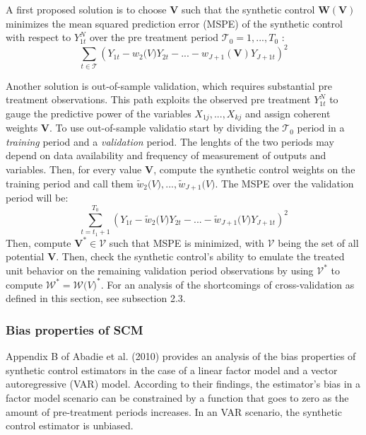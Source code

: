 \documentclass[12pt,a4paper,draft]{article}
\begin{document}
A first proposed solution is to choose $\mathbf{V}$ such that the synthetic control 
$\mathbf{W}(\mathbf{V})$ minimizes the mean squared prediction error (MSPE) of 
the synthetic control with respect to $Y_{1t}^N$ over the pre treatment period
$\mathcal{T}_0 = 1,..., T_0$ : 
$$ \sum_{t\in\mathcal{T}} {\left(
    Y_{1t}-w_2\mathbf(V)Y_{2t}-...-w_{J+1}(\mathbf{V})Y_{J+1t}
\right)} ^2$$

Another solution is out-of-sample validation, which requires substantial pre 
treatment observations. This path exploits the observed pre treatment $Y_{1t}^N$
to gauge the predictive power of the variables $X_{1j},...,X_{kj}$ and assign 
coherent weights $\mathbf{V}$. To use out-of-sample validatio start by 
dividing the $\mathcal{T}_0$ period in a \emph{training} period and a 
\emph{validation} period. The lenghts of the two periods may depend on data 
availability and frequency of measurement of outputs and variables. Then, for 
every value $\mathbf{V}$, compute the synthetic control weights on the training 
period and call them $\tilde{w}_2 \mathbf(V), ..., \tilde{w}_{J+1} \mathbf(V)$.
The MSPE over the validation period will be:
$$ \sum_{t=t_1+1}^{T_0} \left(
    Y_{1t}-\tilde{w}_2 \mathbf(V) Y_{2t} - ... - 
    \tilde{w}_{J+1} \mathbf(V) Y_{J+1t} \right)^2 $$
Then, compute $\mathbf{V}^* \in \mathcal{V}$ such that MSPE is minimized, with 
$\mathcal{V}$ being the set of all potential $\mathbf{V}$. Then, check the synthetic 
control's ability to emulate the treated unit behavior on the remaining validation 
period observations by using $\mathcal{V}^*$ to compute $\mathcal{W}^*=\mathcal{W} 
\mathcal(V)^*$.
\newline For an analysis of the shortcomings of cross-validation as defined in this 
section, see subsection 2.3.

\subsubsection{Bias properties of SCM}
Appendix B of Abadie et al. (2010) provides an analysis of the bias properties of synthetic 
control estimators in the case of a linear factor model and a vector autoregressive 
(VAR) model. According to their findings, the estimator's bias in a factor model 
scenario can be constrained by a function that goes to zero as the amount of 
pre-treatment periods increases. In an VAR scenario, the synthetic control 
estimator is unbiased.
\end{document}
